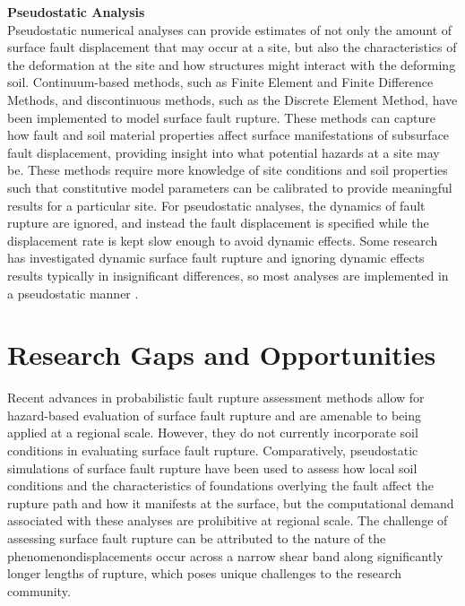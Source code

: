 \noindent\textbf{Pseudostatic Analysis}\\
Pseudostatic numerical analyses can provide estimates of not only the amount of surface fault displacement that may occur at a site, but also the characteristics of the deformation at the site and how structures might interact with the deforming soil. Continuum-based methods, such as Finite Element and Finite Difference Methods, and discontinuous methods, such as the Discrete Element Method, have been implemented to model surface fault rupture. These methods can capture how fault and soil material properties affect surface manifestations of subsurface fault displacement, providing insight into what potential hazards at a site may be. These methods require more knowledge of site conditions and soil properties such that constitutive model parameters can be calibrated to provide meaningful results for a particular site. For pseudostatic analyses, the dynamics of fault rupture are ignored, and instead the fault displacement is specified while the displacement rate is kept slow enough to avoid dynamic effects. Some research has investigated dynamic surface fault rupture \citep{oettle2015dynamic} and ignoring dynamic effects results typically in insignificant differences, so most analyses are implemented in a pseudostatic manner \citep{anastasopoulos2007foundation, anastasopoulos2008numerical, bransby2008centrifuge_reverse, bransby2008centrifuge, oettle2013geotechnical, oettle2017numerical, garcia2018distinct, garcia2018distinct_2}.\\

\section{Research Gaps and Opportunities}
\label{sec:eq_surface_rup_research_gaps}
Recent advances in probabilistic fault rupture assessment methods allow for hazard-based evaluation of surface fault rupture and are amenable to being applied at a regional scale. However, they do not currently incorporate soil conditions in evaluating surface fault rupture. Comparatively, pseudostatic simulations of surface fault rupture have been used to assess how local soil conditions and the characteristics of foundations overlying the fault affect the rupture path and how it manifests at the surface, but the computational demand associated with these analyses are prohibitive at regional scale. The challenge of assessing surface fault rupture can be attributed to the nature of the phenomenon\textemdash displacements occur across a narrow shear band along significantly longer lengths of rupture, which poses unique challenges to the research community.

